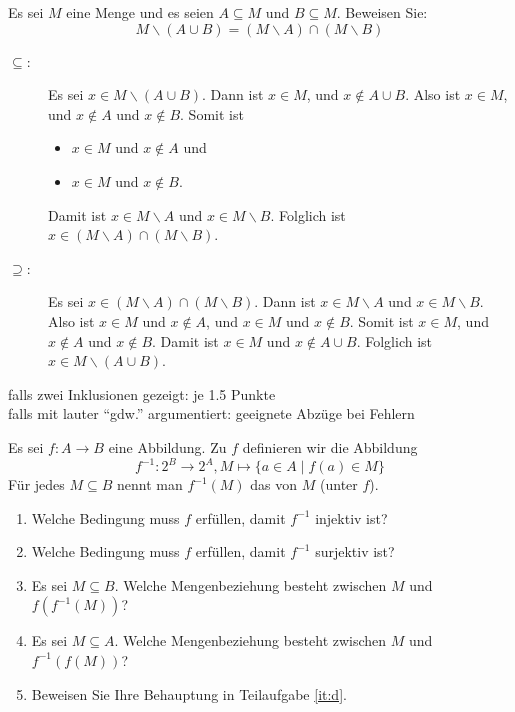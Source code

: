 \documentclass[12pt]{article}
\begin{document}
\def\ssm{\smallsetminus}
\begin{aufgabe}[3]
  Es sei $M$
  eine Menge und es seien $A\subseteq M$
  und $B\subseteq M$. Beweisen Sie:
  \[
    M \smallsetminus (A\cup B) = (M\smallsetminus A) \cap (M\smallsetminus B)
  \]
\end{aufgabe}

\begin{loesung}
  \begin{description}
  \item[$\subseteq$:]
    Es sei $x\in M \ssm (A\cup B)$.
    Dann ist $x\in M$,
    und $x\notin A\cup B$.
    Also ist $x \in M$,
    und $x\notin A$ und $x\notin B$. Somit ist
    \begin{itemize}
    \item $x\in M$ und $x\notin A$ und
    \item $x\in M$ und $x\notin B$.
    \end{itemize}
    Damit ist $x\in M\ssm A$ und $x\in M\ssm B$.
    Folglich ist $x\in (M\ssm A)\cap(M\ssm B)$.
  \item[$\supseteq$:]
    Es sei $x \in (M\smallsetminus A) \cap (M\smallsetminus B)$.
    Dann ist $x \in M\smallsetminus A$ und $x \in M\smallsetminus B$.
    Also ist $x \in M$ und $x \notin A$, und $x \in M$ und $x \notin B$.
    Somit ist $x \in M$, und $x \notin A$ und $x \notin B$.
    Damit ist $x \in M$ und $x \notin A \cup B$.
    Folglich ist $x \in M \ssm (A\cup B)$.
  \end{description}

  \begin{korrektur}
    falls zwei Inklusionen gezeigt: je 1.5 Punkte \\
    falls mit lauter "`gdw."' argumentiert: geeignete Abzüge bei Fehlern
  \end{korrektur}
\end{loesung}

\begin{aufgabe}[1 + 1 + 1 + 1 + 2 = 6]
  Es sei $f\colon A \to B$
  eine Abbildung. Zu $f$ definieren wir die Abbildung
  \[
    f^{-1}\colon 2^B \to 2^A, M \mapsto \{ a\in A \mid f(a) \in M \}
  \]
  Für jedes $M\subseteq B$
  nennt man $f^{-1}(M)$ das  von $M$ (unter $f$).

  \begin{enumerate}
  \item Welche Bedingung muss $f$
    erfüllen, damit $f^{-1}$ injektiv ist?
  \item Welche Bedingung muss $f$
    erfüllen, damit $f^{-1}$ surjektiv ist?
  \item\label{it:d} Es sei $M\subseteq B$.
    Welche Mengenbeziehung besteht zwischen $M$ und $f(f^{-1}(M))$?
  \item Es sei $M\subseteq A$.
    Welche Mengenbeziehung besteht zwischen $M$ und $f^{-1}(f(M))$?
  \item Beweisen Sie Ihre Behauptung in Teilaufgabe \ref{it:d}.
  \end{enumerate}
\end{aufgabe}
\end{document}
